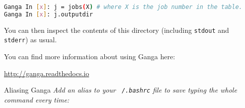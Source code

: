 \begin{lstlisting}[gobble=0,numbers=none,language=bash]
Ganga In [x]: j = jobs(X) # where X is the job number in the table.
Ganga In [x]: j.outputdir
\end{lstlisting}

You can then inspect the contents of this directory
(including \texttt{stdout} and \texttt{stderr}) as usual.

You can find more information about using Ganga here:

\href{http://ganga.readthedocs.io}{http://ganga.readthedocs.io}

\begin{hintbox}{Aliasing Ganga}
\emph{Add an alias to your \texttt{~/.bashrc} file
to save typing the whole command every time:}

\end{hintbox}

